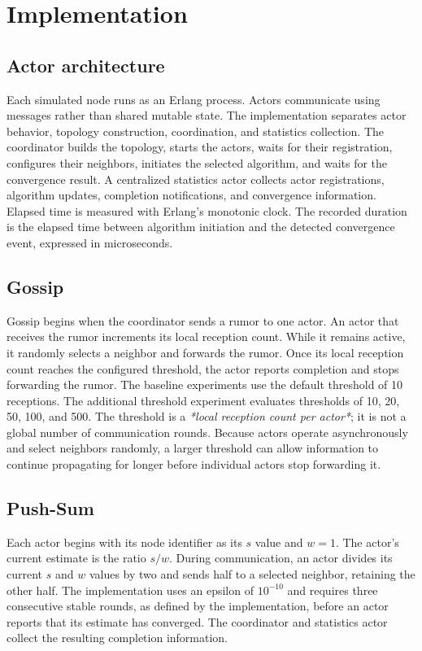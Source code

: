 \documentclass[11pt]{article}
\begin{document}
\section{Implementation}
\par
\subsection{Actor architecture}
Each simulated node runs as an Erlang process. Actors communicate
using messages rather than shared mutable state. The implementation
separates actor behavior, topology construction, coordination, and
statistics collection.
The coordinator builds the topology, starts the actors, waits for
their registration, configures their neighbors, initiates the selected
algorithm, and waits for the convergence result. A centralized
statistics actor collects actor registrations, algorithm updates,
completion notifications, and convergence information.
Elapsed time is measured with Erlang's monotonic clock. The recorded
duration is the elapsed time between algorithm initiation and the
detected convergence event, expressed in microseconds.
\par
\subsection{Gossip}
Gossip begins when the coordinator sends a rumor to one actor. An
actor that receives the rumor increments its local reception count.
While it remains active, it randomly selects a neighbor and forwards
the rumor. Once its local reception count reaches the configured
threshold, the actor reports completion and stops forwarding the rumor.
The baseline experiments use the default threshold of 10 receptions.
The additional threshold experiment evaluates thresholds of
10, 20, 50, 100, and 500.
The threshold is a \emph{*\*local reception count per actor\**}; it is not
a global number of communication rounds. Because actors operate
asynchronously and select neighbors randomly, a larger threshold
can allow information to continue propagating for longer before
individual actors stop forwarding it.
\par
\subsection{Push-Sum}

Each actor begins with its node identifier as its $s$ value and
$w = 1$. The actor's current estimate is the ratio $s/w$. During
communication, an actor divides its current $s$ and $w$ values by
two and sends half to a selected neighbor, retaining the other half.
The implementation uses an epsilon of $10^{-10}$ and requires three
consecutive stable rounds, as defined by the implementation, before
an actor reports that its estimate has converged. The coordinator
and statistics actor collect the resulting completion information.
\par
\end{document}
